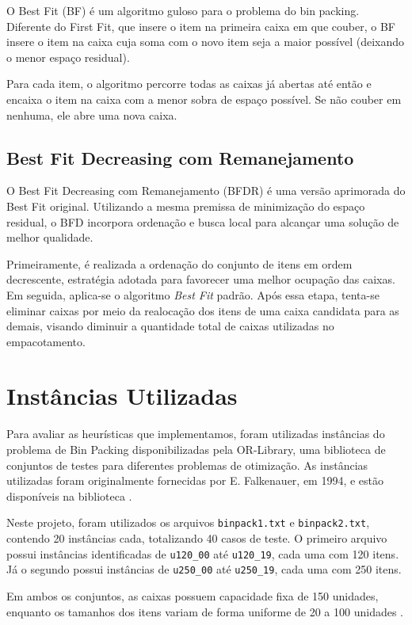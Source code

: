 \documentclass[12pt]{article}
\begin{document}
 O Best Fit (BF) é um algoritmo guloso para o problema do bin packing. Diferente do First Fit, que insere o item na primeira caixa em que couber, o BF insere o item na caixa cuja soma com o novo item seja a maior possível (deixando o menor espaço residual).

Para cada item, o algoritmo percorre todas as caixas já abertas até então e encaixa o item na caixa com a menor sobra de espaço possível. Se não couber em nenhuma, ele abre uma nova caixa.


\subsection{Best Fit Decreasing com Remanejamento}
O  Best Fit Decreasing com Remanejamento (BFDR) é uma versão aprimorada do Best Fit original. Utilizando a mesma premissa de minimização do espaço residual, o BFD incorpora ordenação e busca local para alcançar uma solução de melhor qualidade.

Primeiramente, é realizada a ordenação do conjunto de itens em ordem decrescente, estratégia adotada para favorecer uma melhor ocupação das caixas. Em seguida, aplica-se o algoritmo \textit{Best Fit} padrão. Após essa etapa, tenta-se eliminar caixas por meio da realocação dos itens de uma caixa candidata para as demais, visando diminuir a quantidade total de caixas utilizadas no empacotamento.

\section{Instâncias Utilizadas}

Para avaliar as heurísticas que implementamos, foram utilizadas instâncias do problema de Bin Packing disponibilizadas pela OR-Library, uma biblioteca de conjuntos de testes para diferentes problemas de otimização. As instâncias utilizadas foram originalmente fornecidas por E. Falkenauer, em 1994, e estão disponíveis na biblioteca \cite{orlibrary}.

Neste projeto, foram utilizados os arquivos \texttt{binpack1.txt} e \texttt{binpack2.txt}, contendo 20 instâncias cada, totalizando 40 casos de teste. O primeiro arquivo possui instâncias identificadas de \texttt{u120\_00} até \texttt{u120\_19}, cada uma com 120 itens. Já o segundo possui instâncias de \texttt{u250\_00} até \texttt{u250\_19}, cada uma com 250 itens.

Em ambos os conjuntos, as caixas possuem capacidade fixa de 150 unidades, enquanto os tamanhos dos itens variam de forma uniforme de 20 a 100 unidades \cite{orlibrary}. 
\end{document}
